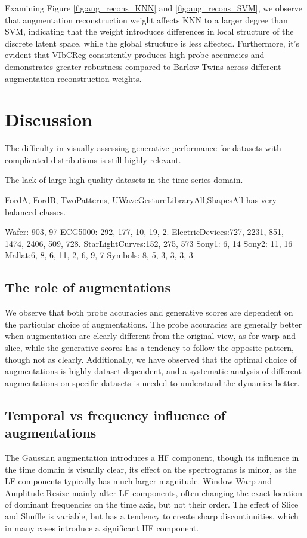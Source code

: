 \documentclass[../../thesis.tex]{subfiles}
\begin{document}
Examining Figure \ref{fig:aug_recons_KNN} and \ref{fig:aug_recons_SVM}, we observe that augmentation reconstruction weight affects KNN to a larger degree than SVM, indicating that the weight introduces differences in local structure of the discrete latent space, while the global structure is less affected. Furthermore, it's evident that VIbCReg consistently produces high probe accuracies and demonstrates greater robustness compared to Barlow Twins across different augmentation reconstruction weights.

\section{Discussion}
The difficulty in visually assessing generative performance for datasets with complicated distributions is still highly relevant.\newline

The lack of large high quality datasets in the time series domain. 

FordA, FordB, TwoPatterns, UWaveGestureLibraryAll,ShapesAll has very balanced classes.

Wafer: 903, 97
ECG5000: 292, 177, 10, 19, 2. 
ElectricDevices:727, 2231, 851, 1474, 2406, 509, 728.
StarLightCurves:152, 275, 573
Sony1: 6, 14
Sony2: 11, 16
Mallat:6, 8, 6, 11, 2, 6, 9, 7
Symbols: 8, 5, 3, 3, 3, 3
\subsection*{The role of augmentations}
We observe that both probe accuracies and generative scores are dependent on the particular choice of augmentations. The probe accuracies are generally better when augmentation are clearly different from the original view, as for warp and slice, while the generative scores has a tendency to follow the opposite pattern, though not as clearly. Additionally, we have observed that the optimal choice of augmentations is highly dataset dependent, and a systematic analysis of different augmentations on specific datasets is needed to understand the dynamics better.

\subsection*{Temporal vs frequency influence of augmentations}

The Gaussian augmentation introduces a HF component, though its influence in the time domain is visually clear, its effect on the spectrograms is minor, as the LF components typically has much larger magnitude. Window Warp and Amplitude Resize mainly alter LF components, often changing the exact location of dominant frequencies on the time axis, but not their order. The effect of Slice and Shuffle is variable, but has a tendency to create sharp discontinuities, which in many cases introduce a significant HF component.\newline
\end{document}
